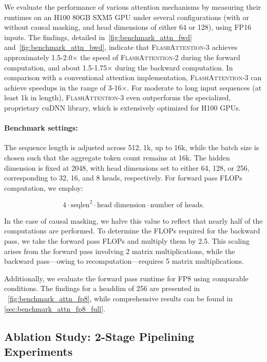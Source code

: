 \begin{algorithm}[H]
\begin{algorithmic}[1]
\begin{itemize}
We evaluate the performance of various attention mechanisms by measuring their runtimes on an H100 80GB SXM5 GPU under several configurations (with or without causal masking, and head dimensions of either 64 or 128), using FP16 inputs. The findings, detailed in~\cref{fig:benchmark_attn_fwd} and~\cref{fig:benchmark_attn_bwd}, indicate that \textsc{FlashAttention-3} achieves approximately 1.5-2.0$\times$ the speed of \textsc{FlashAttention-2} during the forward computation, and about 1.5-1.75$\times$ during the backward computation. In comparison with a conventional attention implementation, \textsc{FlashAttention-3} can achieve speedups in the range of 3-16$\times$. For moderate to long input sequences (at least 1k in length), \textsc{FlashAttention-3} even outperforms the specialized, proprietary cuDNN library, which is extensively optimized for H100 GPUs.

\paragraph{Benchmark settings:} The sequence length is adjusted across 512, 1k, up to 16k, while the batch size is chosen such that the aggregate token count remains at 16k. The hidden dimension is fixed at 2048, with head dimensions set to either 64, 128, or 256, corresponding to 32, 16, and 8 heads, respectively. For forward pass FLOPs computation, we employ:

\begin{equation*}
  4 \cdot \text{seqlen}^2 \cdot \text{head dimension} \cdot \text{number of heads}.
\end{equation*}

In the case of causal masking, we halve this value to reflect that nearly half of the computations are performed. To determine the FLOPs required for the backward pass, we take the forward pass FLOPs and multiply them by 2.5. This scaling arises from the forward pass involving 2 matrix multiplications, while the backward pass—owing to recomputation—requires 5 matrix multiplications.

Additionally, we evaluate the forward pass runtime for FP8 using comparable conditions. The findings for a headdim of 256 are presented in ~\cref{fig:benchmark_attn_fp8}, while comprehensive results can be found in \cref{sec:benchmark_attn_fp8_full}.

\subsection{Ablation Study: 2-Stage Pipelining Experiments}
\label{sec:2-stage-pipelining-experiments}


\end{itemize}
\end{algorithmic}
\end{algorithm}
